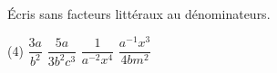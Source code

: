%
%
    Écris sans facteurs littéraux au dénominateurs.
    \begin{tasks}(4)
        \task \(\dfrac{3a}{b^2}\)
        \task \(\dfrac{5a}{3b^2c^3}\)
        \task \(\dfrac{1}{a^{-2}x^4}\)
        \task \(\dfrac{a^{-1}x^3}{4bm^{2}}\)
    \end{tasks}
